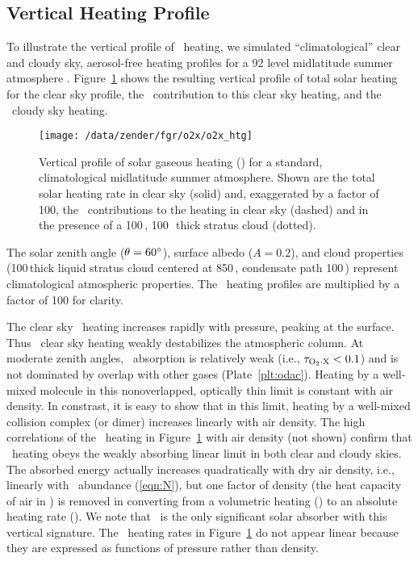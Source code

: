 \documentclass[agupp,twoside]{aguplus} %
\newlength{\fltwdtsngclm}\setlength{\fltwdtsngclm}{20.0pc} %
\begin{document}
\subsection{Vertical Heating Profile}\label{sxn:htg}
To illustrate the vertical profile of \OdX\ heating, we simulated
``climatological'' clear and cloudy sky, aerosol-free heating profiles
for a 92 level midlatitude summer atmosphere \cite[]{Bri921}.
Figure~\ref{fgr:odx_htg} shows the resulting vertical profile of total 
solar heating for the clear sky profile, the \OdX\ contribution to
this clear sky heating, and the \OdX\ cloudy sky heating.   
\begin{figure}
\begin{center}
\texttt{[image: /data/zender/fgr/o2x/o2x\_htg]}\vfill
\end{center}
\caption{
Vertical profile of solar gaseous heating (\kxd) for a standard,
climatological midlatitude summer atmosphere.
Shown are the total solar heating rate in clear sky (solid) and,
exaggerated by a factor of 100, the \OdX\ contributions to the heating
in clear sky (dashed) and in the presence of a 100\,\gxmS, 100\,\mb\ thick
stratus cloud (dotted).
\label{fgr:odx_htg}}   
\end{figure}
The solar zenith angle ($\theta = 60^{\circ}$), surface albedo ($A
= 0.2$), and cloud properties (100\,\mb thick liquid stratus cloud
centered at 850\,\mb, condensate path 100\,\gxmS) represent
climatological atmospheric properties.  
The \OdX\ heating profiles are multiplied by a factor of 100 for
clarity.  

The clear sky \OdX\ heating increases rapidly with pressure, peaking
at the surface. 
Thus \OdX\ clear sky heating weakly destabilizes the atmospheric
column. 
At moderate zenith angles, \OdX\ absorption is relatively weak (i.e.,
$\tau_{\mathrm{O}_{2} \cdot \mathrm{X}} < 0.1$) and is not dominated by overlap with other gases
(Plate~\ref{plt:odac}). 
Heating by a well-mixed molecule in this nonoverlapped, optically
thin limit is constant with air density.  
In constrast, it is easy to show that in this limit, heating by a
well-mixed collision complex (or dimer) increases linearly with
air density.  
The high correlations of the \OdX\ heating in Figure~\ref{fgr:odx_htg}
with air density (not shown) confirm that \OdX\ heating obeys the
weakly absorbing linear limit in both clear and cloudy skies.
The absorbed energy actually increases quadratically with dry air
density, i.e., linearly with \OdX\ abundance (\ref{eqn:N}), but one
factor of density (the heat capacity of air in \jxmCK) is removed in
converting from a volumetric heating (\wxmC) to an absolute heating
rate (\kxd).  
We note that \OdX\ is the only significant solar absorber with this 
vertical signature. 
The \OdX\ heating rates in Figure~\ref{fgr:odx_htg} do not appear 
linear because they are expressed as functions of pressure rather
than density. 
\end{document}
